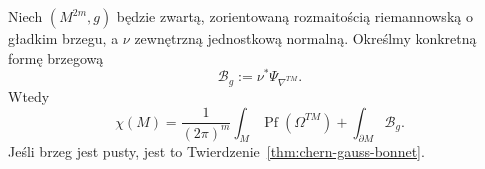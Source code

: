 \begin{twierdzenie}
\label{thm:CGB-boundary-26}
Niech $(M^{2m},g)$ będzie zwartą,
zorientowaną rozmaitością
riemannowską o gładkim brzegu,
a $\nu$ zewnętrzną jednostkową
normalną. Określmy konkretną
formę brzegową
\begin{equation}\label{eq:CGB-boundary-form-26}
 \mathcal B_g:=\nu^*
       \Psi_{\nabla^{TM}}.
\end{equation}
Wtedy
\begin{equation}\label{eq:CGB-boundary-26}
 \boxed{\displaystyle
 \chi(M)=\frac{1}{(2\pi)^m}
     \int_M\operatorname{Pf}(\Omega^{TM})
       +\int_{\partial M}\mathcal B_g.}
\end{equation}
Jeśli brzeg jest pusty, jest to
Twierdzenie~\ref{thm:chern-gauss-bonnet}.
\end{twierdzenie}
